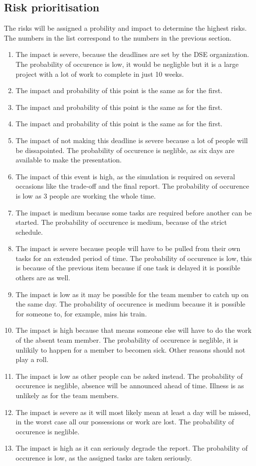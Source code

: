 \subsection{Risk prioritisation}
The risks will be assigned a probility and impact to determine the highest risks.
The numbers in the list correspond to the numbers in the previous section.
\begin{enumerate}
	\item The impact is severe, because the deadlines are set by the DSE organization. The probability of occurence is low, it would  be negligble but it is a large project with a lot of work to complete in just 10 weeks.
	\item The impact and probability of this point is the same as for the first.
	\item The impact and probability of this point is the same as for the first.
	\item The impact and probability of this point is the same as for the first.
	\item The impact of not making this deadline is severe because a lot of people will be dissapointed. The probability of occurence is neglible, as six days are available to make the presentation.
	\item The impact of this event is high, as the simulation is required on several occasions like the trade-off and the final report. The probability of occurence is low as 3 people are working the whole time.
	\item The impact is medium because some tasks are required before another can be started. The probability of occurence is medium, because of the strict schedule.
	\item The impact is severe because people will have to be pulled from their own tasks for an extended period of time. The probability of occurence is low, this is because of the previous item because if one task is delayed it is possible others are as well.
	\item The impact is low as it may be possible for the team member to catch up on the same day. The probability of occurence is medium because it is possible for someone to, for example, miss his train.
	\item The impact is high because that means someone else will have to do the work of the absent team member. The probability of occurence is neglible, it is unlikily to happen for a member to becomen sick. Other reasons should not play a roll.
	\item The impact is low as other people can be asked instead. The probability of occurence is neglible, absence will be announced ahead of time. Illness is as unlikely as for the team members.
	\item The impact is severe as it will most likely mean at least a day will be missed, in the worst case all our possessions or work are lost. The probability of occurence is neglible.
	\item The impact is high as it can seriously degrade the report. The probability of occurence is low, as the assigned tasks are taken seriously.
\end{enumerate}

